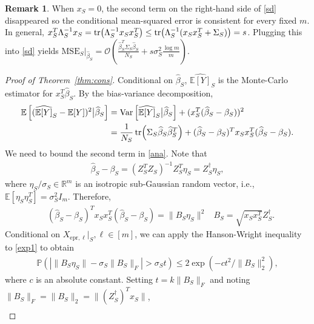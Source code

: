 \documentclass[11pt,a4paper]{amsart}
\numberwithin{equation}{section}
\theoremstyle{plain}
\theoremstyle{definition}
\newtheorem{Rem}[Th]{Remark}
\def\R{{\mathbb R}}
\def\E{{\mathbb E}}
\def\R{{\mathbb R}}
\def\P{{\mathbb P}}
\def\var{{\text{Var}}}
\def\ex{{\text{epr}}}
\def\mse{{\text{MSE}}}
\begin{document}
\begin{Rem}
When $x_S =0$, the second term on the right-hand side of \eqref{sd} disappeared so the conditional mean-squared error is consistent for every fixed $m$. 
In general, $x_S^T\Lambda_S^{-1}x_S = \tr(\Lambda_S^{-1}x_Sx_S^T)\leq \tr(\Lambda_S^{-1}(x_Sx_S^T+\Sigma_S))= s$. Plugging this into \eqref{sd} yields $\mse_S|_{\widehat{\beta}_S} = \mathcal O\left(\frac{\widehat{\beta}_S^T\Sigma_S\widehat{\beta}_S}{N_S}+s\sigma_S^2\frac{\log m}{m}\right)$.
\end{Rem}




\begin{proof}[Proof of Theorem~\ref{thm:cons}]
Conditional on $\widehat{\beta}_S$, $\widehat{\E[Y]}_S$ is the Monte-Carlo estimator for $x^T_S\widehat{\beta}_S$. By the bias-variance decomposition, 
\begin{align}
\E\left[(\widehat{\E[Y]}_S-\E[Y])^2\big |\widehat{\beta}_S\right] &= \var\left[\widehat{\E[Y]}_S\big |\widehat{\beta}_S\right] + (x_S^T(\widehat{\beta}_S-\beta_S))^2\nonumber\\
& = \frac{1}{N_S}\tr(\Sigma_S\widehat{\beta}_S\widehat{\beta}_S^T) + (\widehat{\beta}_S-\beta_S)^Tx_Sx_S^T(\widehat{\beta}_S-\beta_S).\label{ana}
\end{align} 
We need to bound the second term in \eqref{ana}.
Note that  
\begin{align}
\widehat{\beta}_S - \beta_S =  (Z_S^TZ_S)^{-1}Z_S^T\eta_S = Z_S^\dagger\eta_S,\label{pt}
\end{align}
where $\eta_S/\sigma_S\in\R^m$ is an isotropic sub-Gaussian random vector, i.e., $\E[\eta_S\eta_S^T] = \sigma_S^2I_m$. Therefore,
\begin{align}
&(\widehat{\beta}_S-\beta_S)^Tx_Sx_S^T(\widehat{\beta}_S-\beta_S) = \|B_S\eta_S\|^2&B_S = \sqrt{x_Sx_S^T}Z_S^\dagger.\label{exp1}
\end{align}
Conditional on $X_{\ex,\ell}|_S, \ell\in [m]$, we can apply the Hanson-Wright inequality \cite[Theorem 6.3.2]{Vershynin_2018} to \eqref{exp1} to obtain 
\begin{align*}
\P\left(\left|\|B_S\eta_S\|-\sigma_S\|B_S\|_F\right|>\sigma_St\right)\leq 2\exp(-ct^2/\|B_S\|_2^2),
\end{align*}
where $c$ is an absolute constant. 
Setting $t=k\|B_S\|_F$ and noting $\|B_S\|_F = \|B_S\|_2= \|(Z_S^\dagger)^T x_S\|$, 
\begin{align}

\end{align}
\end{proof}
\end{document}
